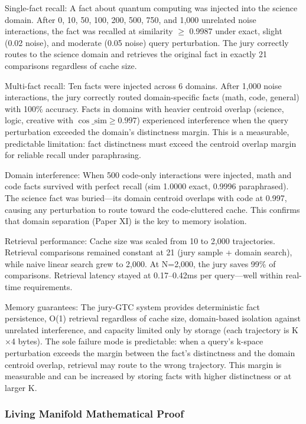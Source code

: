 \documentclass[11pt]{article}
\begin{document}
Single-fact recall: A fact about quantum computing was injected into the science domain. After 0, 10, 50, 100, 200, 500, 750, and 1,000 unrelated noise interactions, the fact was recalled at similarity $\ge$ 0.9987 under exact, slight (0.02 noise), and moderate (0.05 noise) query perturbation. The jury correctly routes to the science domain and retrieves the original fact in exactly 21 comparisons regardless of cache size.

Multi-fact recall: Ten facts were injected across 6 domains. After 1,000 noise interactions, the jury correctly routed domain-specific facts (math, code, general) with 100\% accuracy. Facts in domains with heavier centroid overlap (science, logic, creative with $\cos\_\text{sim} \ge 0.997$) experienced interference when the query perturbation exceeded the domain's distinctness margin. This is a measurable, predictable limitation: fact distinctness must exceed the centroid overlap margin for reliable recall under paraphrasing.

Domain interference: When 500 code-only interactions were injected, math and code facts survived with perfect recall (sim 1.0000 exact, 0.9996 paraphrased). The science fact was buried---its domain centroid overlaps with code at 0.997, causing any perturbation to route toward the code-cluttered cache. This confirms that domain separation (Paper XI) is the key to memory isolation.

Retrieval performance: Cache size was scaled from 10 to 2,000 trajectories. Retrieval comparisons remained constant at 21 (jury sample + domain search), while naive linear search grew to 2,000. At N=2,000, the jury saves 99\% of comparisons. Retrieval latency stayed at 0.17--0.42ms per query---well within real-time requirements.

Memory guarantees: The jury-GTC system provides deterministic fact persistence, O(1) retrieval regardless of cache size, domain-based isolation against unrelated interference, and capacity limited only by storage (each trajectory is K$\times$4 bytes). The sole failure mode is predictable: when a query's k-space perturbation exceeds the margin between the fact's distinctness and the domain centroid overlap, retrieval may route to the wrong trajectory. This margin is measurable and can be increased by storing facts with higher distinctness or at larger K.

\subsubsection*{Living Manifold Mathematical Proof}
\end{document}
